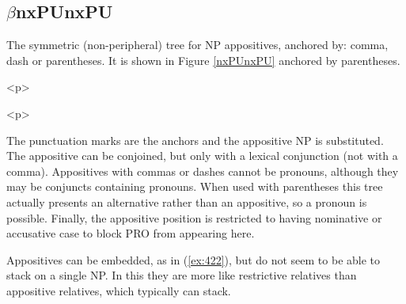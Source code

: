 \subsection{$\beta$nxPUnxPU} 
 
The symmetric (non-peripheral) tree for NP appositives, anchored by: 
comma, dash or parentheses. It is shown in Figure \ref{nxPUnxPU} anchored by 
parentheses. 
 
\beginsentences
{}\label{ex:418} 
\label{ex:419} 
\label{ex:420} 
\endsentences

 
\beginsentences
{}\label{ex:421} 
\endsentences

 
\begin{rawhtml} <p> \end{rawhtml}
\centering 
\hspace{0.0in} 
\begin{rawhtml} <dl> <dt>{The $\beta$nxPUnxPU tree, anchored by parentheses <p> </dl> \end{rawhtml}
\label{nxPUnxPU} 
\begin{rawhtml} <p> \end{rawhtml}
 
 
The punctuation marks are the anchors and the appositive NP is 
substituted. The appositive can be conjoined, but only with a lexical 
conjunction (not with a comma). Appositives with commas or dashes 
cannot be pronouns, although they may be conjuncts containing 
pronouns.  When used with 
parentheses this tree actually presents an alternative rather than an 
appositive, so a pronoun is possible. Finally, the appositive position 
is restricted to having nominative or accusative case to block PRO 
from appearing here. 
 
Appositives can be embedded, as in (\ref{ex:422}), but do not seem to be 
able to stack on a single NP. In this they are more like restrictive 
relatives than appositive relatives, which typically can stack. 
 
\beginsentences
{}\label{ex:422} 
\endsentences

